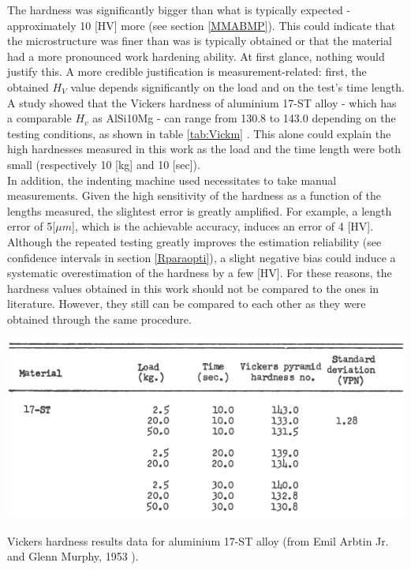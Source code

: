 The hardness was significantly bigger than what is typically expected - approximately 10 [HV] more (see section \ref{MMABMP}). This could indicate that the microstructure was finer than was is typically obtained or that the material had a more pronounced work hardening ability. At first glance, nothing would justify this. A more credible justification is measurement-related: first, the obtained $H_V$ value depends significantly on the load and on the test's time length. A study showed that the Vickers hardness of aluminium 17-ST alloy - which has a comparable $H_v$ as AlSi10Mg - can range from 130.8 to 143.0 depending on the testing conditions, as shown in table \ref{tab:Vickm} \parencite{Arbtin}. This alone could explain the high hardnesses measured in this work as the load and the time length were both small (respectively 10 [kg] and 10 [sec]).\\ 

In addition, the indenting machine used necessitates to take manual measurements. Given the high sensitivity of the hardness as a function of the lengths measured, the slightest error is greatly amplified. For example, a length error of 5[$\mu m$], which is the achievable accuracy, induces an error of 4 [HV]. Although the repeated testing greatly improves the estimation reliability (see confidence intervals in section \ref{Rparaopti}), a slight negative bias could induce a systematic overestimation of the hardness by a few [HV]. For these reasons, the hardness values obtained in this work should not be compared to the ones in literature. However, they still can be compared to each other as they were obtained through the same procedure.\\

\begin{table}[ht]
		\centering
			\includegraphics[scale=0.90]{Images/Vickm}
			\decoRule
		\caption[Vickers hardness results data for aluminium 17-ST alloy.]{Vickers hardness results data for aluminium 17-ST alloy (from Emil Arbtin Jr. and Glenn Murphy, 1953 \parencite{Arbtin}).}
		\label{tab:Vickm}
\end{table}

